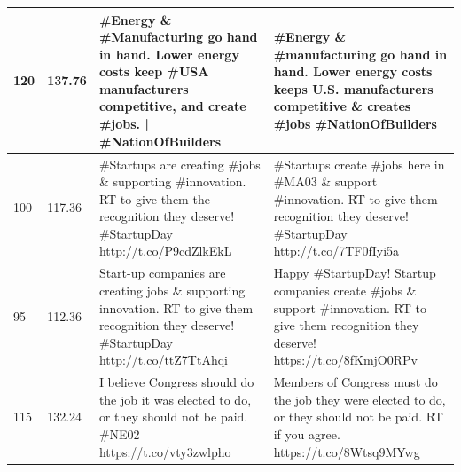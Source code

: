 \documentclass[11pt]{article}
\begin{document}
\begin{flushleft}
\begin{table}[]
\begin{tabular}{|p{}|p{}|p{}|p{}|}
120      & 137.76    & \#Energy \& \#Manufacturing go hand in hand. Lower energy costs keep \#USA manufacturers competitive, and create \#jobs. | \#NationOfBuilders        & \#Energy \& \#manufacturing go hand in hand. Lower energy costs keeps U.S. manufacturers competitive \& creates \#jobs \#NationOfBuilders         \\ \hline
100      & 117.36    & \#Startups are creating \#jobs \& supporting \#innovation. RT to give them the recognition they deserve! \#StartupDay http://t.co/P9cdZlkEkL         & \#Startups create \#jobs here in \#MA03 \& support \#innovation. RT to give them recognition they deserve! \#StartupDay http://t.co/7TF0fIyi5a        \\ \hline
95       & 112.36    & Start-up companies are creating jobs \& supporting innovation. RT to give them recognition they deserve! \#StartupDay http://t.co/ttZ7TtAhqi         & Happy \#StartupDay! Startup companies create \#jobs \& support \#innovation. RT to give them recognition they deserve! https://t.co/8fKmjO0RPv        \\ \hline
115      & 132.24    & I believe Congress should do the job it was elected to do, or they should not be paid. \#NE02 https://t.co/vty3zwlpho                                    & Members of Congress must do the job they were elected to do, or they should not be paid. RT if you agree. https://t.co/8Wtsq9MYwg                         \\ \hline
\end{tabular}
\end{table}








\end{flushleft}
\end{document}
